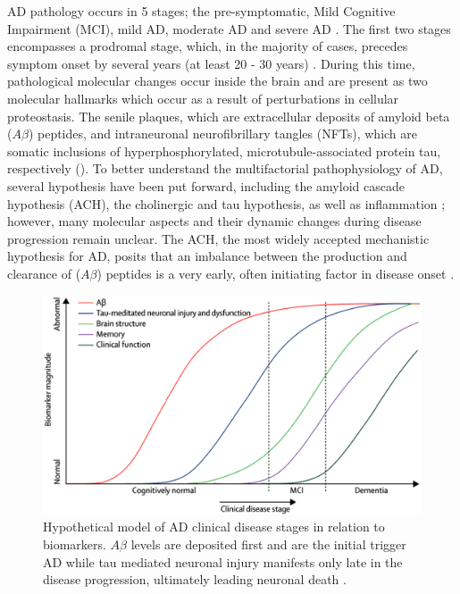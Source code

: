 AD pathology occurs in 5 stages; the pre-symptomatic, Mild Cognitive Impairment (MCI), mild AD, moderate AD and severe AD \citep{Caldwell2015}. The first two stages encompasses a prodromal stage, which, in the majority of cases, precedes symptom onset by several years (at least 20 - 30 years) \citep{Caldwell2015,Caselli2013,Penn1993}. During this time, pathological molecular changes occur inside the brain and are present as two molecular hallmarks which occur as a result of perturbations in cellular proteostasis. The senile plaques, which are extracellular deposits of amyloid beta ($A\beta$)
peptides, and intraneuronal neurofibrillary tangles (NFTs), which are somatic inclusions of hyperphosphorylated, microtubule-associated protein tau, respectively \citep{Mattson2008} (). To better understand the multifactorial pathophysiology of AD, several hypothesis have been put forward, including the amyloid cascade hypothesis (ACH), the cholinergic and tau hypothesis, as well as inflammation \citep{Kurz2011}; however, many molecular aspects and their dynamic changes during disease progression remain unclear. The ACH, the most widely accepted mechanistic hypothesis for AD, posits that an imbalance between the production and clearance of ($A\beta$) peptides is a very early, often initiating factor in disease onset \citep{Hardy2009,Hardy1992}.

\begin{figure}[h!]
  \includegraphics[width=\linewidth]{figures/10_ad_model}
  \caption{Hypothetical model of AD clinical disease stages in relation to biomarkers.  $A\beta$ levels are deposited first and are the initial trigger AD while tau mediated neuronal injury manifests only late in the disease progression, ultimately leading neuronal death \citep{Petrella2013} .}
  \label{fig:10_ad_model}
\end{figure}

